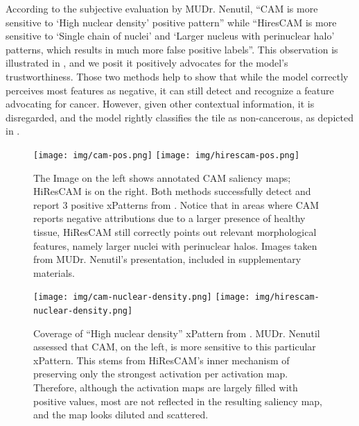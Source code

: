 According to the subjective evaluation by MUDr. Nenutil, ``CAM is more sensitive to `High nuclear density' positive pattern'' while ``HiresCAM is more sensitive to `Single chain of nuclei' and `Larger nucleus with perinuclear halo' patterns, which results in much more false positive labels''.
This observation is illustrated in , and we posit it positively advocates for the model's trustworthiness. 
Those two methods help to show that while the model correctly perceives most features as negative, it can still detect and recognize a feature advocating for cancer.
However, given other contextual information, it is disregarded, and the model rightly classifies the tile as non-cancerous, as depicted in .

\begin{figure}
    \begin{center}
    \begin{minipage}{1\textwidth}
      {\texttt{[image: img/cam-pos.png]}
      \texttt{[image: img/hirescam-pos.png]}}
    \end{minipage}
    \caption{The Image on the left shows annotated CAM saliency maps; HiResCAM is on the right. Both methods successfully detect and report $3$ positive xPatterns from \cite{gallo}. Notice that in areas where CAM reports negative attributions due to a larger presence of healthy tissue, HiResCAM still correctly points out relevant morphological features, namely larger nuclei with perinuclear halos. Images taken from MUDr. Nenutil's presentation, included in supplementary materials.}
    \label{fig:both-pos}
    \end{center}
\end{figure}

\begin{figure}
    \begin{center}
    \begin{minipage}{1\textwidth}
      {\texttt{[image: img/cam-nuclear-density.png]}
      \texttt{[image: img/hirescam-nuclear-density.png]}}
    \end{minipage}
    \caption{Coverage of ``High nuclear density'' xPattern from \cite{gallo}. MUDr. Nenutil assessed that CAM, on the left, is more sensitive to this particular xPattern. This stems from HiResCAM's inner mechanism of preserving only the strongest activation per activation map. Therefore, although the activation maps are largely filled with positive values, most are not reflected in the resulting saliency map, and the map looks diluted and scattered.}
    \label{fig:both-nuclear-density}
    \end{center}
\end{figure}

